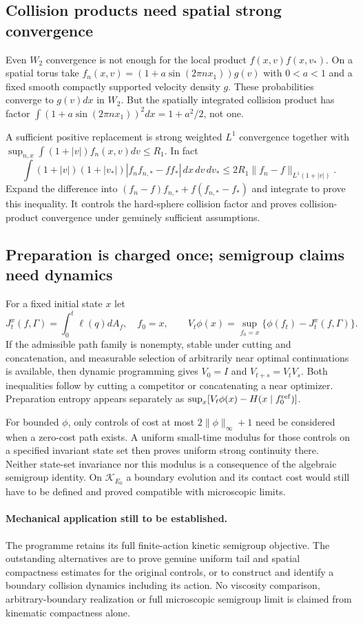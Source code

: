 \subsection{Collision products need spatial strong convergence}
Even $W_2$ convergence is not enough for the local product $f(x,v)f(x,v_*)$. On a spatial torus take
$f_n(x,v)=(1+a\sin(2\pi nx_1))g(v)$ with $0<a<1$ and a fixed smooth compactly supported velocity density $g$. These probabilities converge to $g(v)dx$ in $W_2$. But the spatially integrated collision product has factor
$\int(1+a\sin(2\pi nx_1))^2dx=1+a^2/2$, not one.

A sufficient positive replacement is strong weighted $L^1$ convergence together with
$\sup_{n,x}\int(1+|v|)f_n(x,v)dv\le R_1$. In fact
\[
 \int (1+|v|)(1+|v_*|)|f_nf_{n,*}-ff_*|\,dx\,dv\,dv_*
 \le2R_1\|f_n-f\|_{L^1(1+|v|)}.
\]
Expand the difference into $(f_n-f)f_{n,*}+f(f_{n,*}-f_*)$ and integrate to prove this inequality. It controls the hard-sphere collision factor and proves collision-product convergence under genuinely sufficient assumptions.

\subsection{Preparation is charged once; semigroup claims need dynamics}
For a fixed initial state $x$ let
\[
 J_t^x(f,\Gamma)=\int_0^t\ell(q)dA_f,\quad f_0=x,
 \qquad V_t\phi(x)=\sup_{f_0=x}\{\phi(f_t)-J_t^x(f,\Gamma)\}.
\]
If the admissible path family is nonempty, stable under cutting and concatenation, and measurable selection of arbitrarily near optimal continuations is available, then dynamic programming gives $V_0=I$ and $V_{t+s}=V_tV_s$. Both inequalities follow by cutting a competitor or concatenating a near optimizer. Preparation entropy appears separately as $\sup_x[V_t\phi(x)-H(x\mid f_0^{\rm ref})]$.

For bounded $\phi$, only controls of cost at most $2\|\phi\|_\infty+1$ need be considered when a zero-cost path exists. A uniform small-time modulus for those controls on a specified invariant state set then proves uniform strong continuity there. Neither state-set invariance nor this modulus is a consequence of the algebraic semigroup identity. On $\mathcal K_{E_0}$ a boundary evolution and its contact cost would still have to be defined and proved compatible with microscopic limits.

\paragraph{Mechanical application still to be established.}
The programme retains its full finite-action kinetic semigroup objective. The outstanding alternatives are to prove genuine uniform tail and spatial compactness estimates for the original controls, or to construct and identify a boundary collision dynamics including its action. No viscosity comparison, arbitrary-boundary realization or full microscopic semigroup limit is claimed from kinematic compactness alone.
